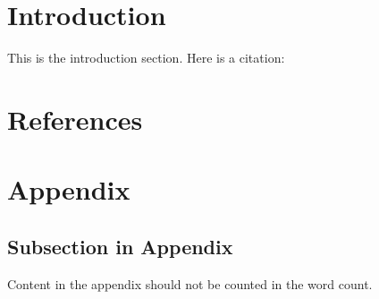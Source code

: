 \documentclass{article}%
\begin{document}
%
\newpage%
\listoffigures%
\newpage%
\listoftables%
\newpage%
\section{Introduction}%
\label{sec:Introduction}%
This is the introduction section. Here is a citation: %
\cite{example_reference}

%
\newpage%
\section{References}%
\label{sec:References}%
\printbibliography

%
\newpage%
\section{Appendix}%
\label{sec:Appendix}%
\subsection{Subsection in Appendix}%
\label{subsec:SubsectioninAppendix}%
Content in the appendix should not be counted in the word count.

%
\end{document}
